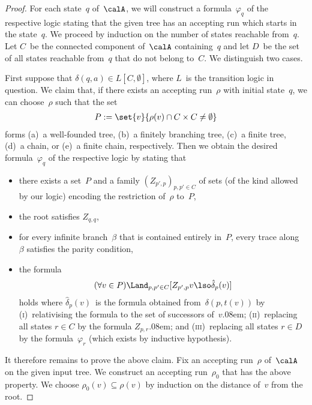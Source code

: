 \documentclass[10pt, fleqn]{scrartcl}
\newcommand*{\?}{\kern .08em}
\begin{document}
\begin{proof}
For each state~$q$ of~$\calA$, we will construct a formula~$\varphi_q$ of the
respective logic stating that the given tree has an accepting run which starts
in the state~$q$. We proceed by induction on the number of states reachable from~$q$.
Let $C$~be the connected component of~$\calA$ containing~$q$ and let
$D$~be the set of all states reachable from~$q$ that do not belong to~$C$.
We distinguish two cases.

First suppose that $\delta(q,a) \in L[C,\emptyset]$, where $L$~is the transition logic
in question. We claim that, if there exists an accepting run~$\rho$ with initial state~$q$,
we can choose~$\rho$ such that the set
\begin{align*}
  P := \set{ v }{ \rho(v) \cap C \times C \neq \emptyset }
\end{align*}
forms (a)~a well-founded tree, (b)~a finitely branching tree, (c)~a finite tree, (d)~a chain, or
(e)~a finite chain, respectively.
Then we obtain the desired formula~$\varphi_q$ of the respective logic by stating that
\begin{itemize}
\item there exists a set~$P$ and a family $(Z_{p',p})_{p,p' \in C}$ of sets
  (of the kind allowed by our logic) encoding the restriction of~$\rho$ to~$P$,
\item the root satisfies $Z_{q,q}$,
\item for every infinite branch~$\beta$ that is contained entirely in~$P$,
  every trace along~$\beta$ satisfies the parity condition,
\item the formula
  \begin{align*}
    (\forall v \in P)\Land_{p,p' \in C} [Z_{p',p}v \lso \hat\delta_p(v)]
  \end{align*}
  holds where $\hat\delta_p(v)$~is the formula obtained from~$\delta(p,t(v))$
  by \textsc{(i)}~relativising the formula to the set of successors of~$v$\?;
  \textsc{(ii)}~replacing all states $r \in C$ by the formula $Z_{p,r}$\?;
  and \textsc{(iii)}~replacing all states $r \in D$ by the formula~$\varphi_r$
  (which exists by inductive hypothesis).
\end{itemize}

It therefore remains to prove the above claim.
Fix an accepting run~$\rho$ of~$\calA$ on the given input tree.
We construct an accepting run~$\rho_0$ that has the above property.
We choose $\rho_0(v) \subseteq \rho(v)$ by induction on the distance of~$v$ from the root.


\end{proof}
\end{document}
